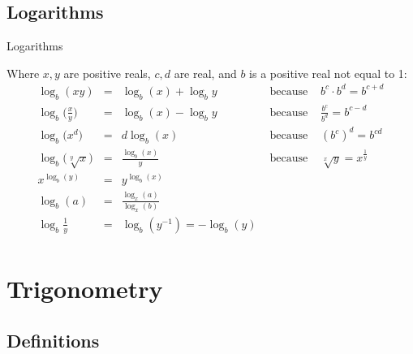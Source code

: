 \subsection{Logarithms}

\begin{mybox}{Logarithms}
\begin{center}

Where $x, y$ are positive reals, $c, d$ are real, and $b$ is a positive real not equal to 1:
$$\begin{array}{lclcl}
\log_b (xy)                    & = & \log_b (x) + \log_{b}{y}     & \text{ because } & b^c \cdot b^d = b^{c+d}      \\\hline
\log_b{\big(\frac{x}{y} \big)} & = & \log_b (x) - \log_{b}{y}     & \text{ because } & \frac{b^c}{b^d} = b^{c-d}    \\\hline
\log_b{\big(x^d \big)}         & = & d\log_b (x)                  & \text{ because } & (b^c)^d = b^{cd}             \\\hline
\log_b{\big(\sqrt[y]{x} \big)} & = & \frac{\log_b (x) }{y}        & \text{ because } & \sqrt[x]{y} = x^{\frac{1}{y}}\\\hline
x^{\log_b (y)}                 & = & y^{\log_b (x) }              &                  &                              \\\hline
\log_b (a)                     & = & \frac{\log_x (a)}{\log_x (b)}&                  &                              \\\hline
\log_b{\frac{1}{y}}            & = &\log_b (y^{-1}) = -\log_b (y) &                  &                              \\
\end{array}$$
\end{center}
\end{mybox}

\pagebreak





\section{Trigonometry}

\subsection{Definitions}

